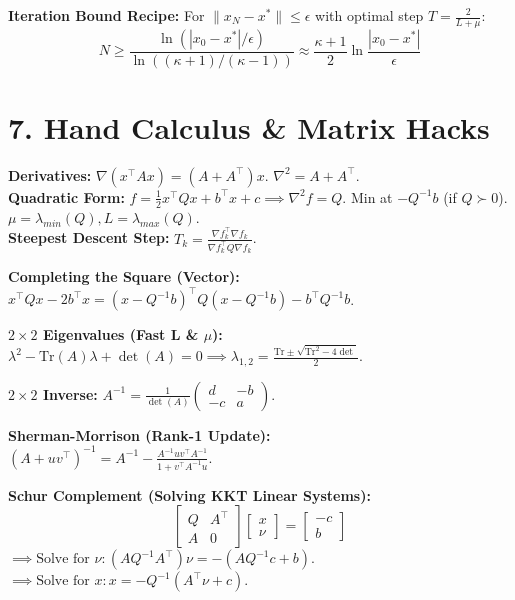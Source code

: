 \textbf{Iteration Bound Recipe:}
For $\|x_N - x^*\| \le \epsilon$ with optimal step $T = \frac{2}{L+\mu}$:
\[ N \ge \frac{\ln(|x_0 - x^*|/\epsilon)}{\ln((\kappa+1)/(\kappa-1))}
\approx \frac{\kappa+1}{2} \ln \frac{|x_0-x^*|}{\epsilon} \]

\section*{7. Hand Calculus \& Matrix Hacks}
\textbf{Derivatives:} $\nabla(x^\top A x)=(A+A^\top)x$. $\nabla^2 =
A+A^\top$. \\
\textbf{Quadratic Form:} $f = \frac{1}{2}x^\top Q x + b^\top x + c
\implies \nabla^2 f = Q$. Min at $-Q^{-1}b$ (if $Q\succ0$). $\mu =
\lambda_{min}(Q), L = \lambda_{max}(Q)$. \\
\textbf{Steepest Descent Step:} $T_k = \frac{\nabla f_k^\top \nabla
f_k}{\nabla f_k^\top Q \nabla f_k}$.

\textbf{Completing the Square (Vector):}
$x^\top Q x - 2 b^\top x = (x-Q^{-1}b)^\top Q (x-Q^{-1}b) - b^\top Q^{-1}b$.

\textbf{$2 \times 2$ Eigenvalues (Fast L \& $\mu$):} \\
$\lambda^2 - \text{Tr}(A)\lambda + \det(A) = 0 \implies \lambda_{1,2}
= \frac{\text{Tr} \pm \sqrt{\text{Tr}^2 - 4\det}}{2}$.

\textbf{$2 \times 2$ Inverse:}
$A^{-1} = \frac{1}{\det(A)}
\begin{pmatrix} d & -b \\ -c & a
\end{pmatrix}$.

\textbf{Sherman-Morrison (Rank-1 Update):} \\
$(A+uv^\top)^{-1} = A^{-1} - \frac{A^{-1}uv^\top A^{-1}}{1+v^\top A^{-1}u}$.

\textbf{Schur Complement (Solving KKT Linear Systems):}
\[
  \begin{bmatrix} Q & A^\top \\ A & 0
  \end{bmatrix}
  \begin{bmatrix} x \\ \nu
  \end{bmatrix} =
  \begin{bmatrix} -c \\ b
  \end{bmatrix}
\]
$\implies \text{Solve for } \nu: (A Q^{-1} A^\top) \nu = -(A Q^{-1} c + b)$. \\
$\implies \text{Solve for } x: x = -Q^{-1}(A^\top \nu + c)$.

